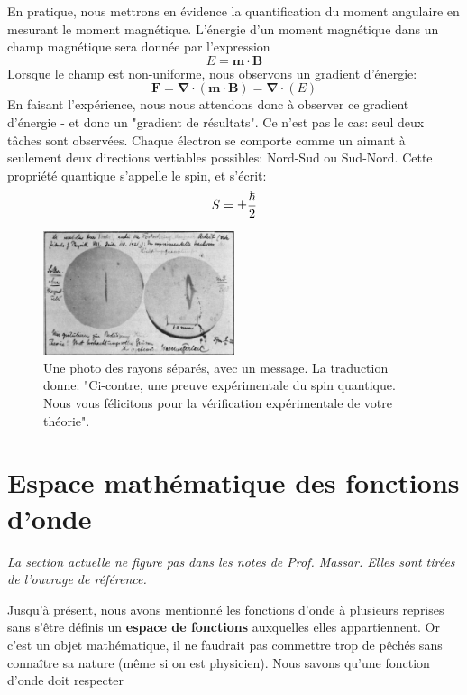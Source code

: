 \documentclass[../notesdecours.tex]{subfiles}
\begin{document}
En pratique, nous mettrons en évidence la quantification du moment angulaire en mesurant le moment magnétique. L'énergie d'un moment magnétique dans un champ magnétique sera donnée par l'expression
\begin{equation}
E = \bm{m}\cdot\bm{B}
\end{equation}
Lorsque le champ est non-uniforme, nous observons un gradient d'énergie:
\begin{equation}
\bm{F} = \bm{\nabla}\cdot(\bm{m}\cdot\bm{B}) = \bm{\nabla}\cdot(E)
\end{equation}
En faisant l'expérience, nous nous attendons donc à observer ce gradient d'énergie - et donc un "gradient de résultats". Ce n'est pas le cas: seul deux tâches sont observées. Chaque électron se comporte comme un aimant à seulement deux directions vertiables possibles: Nord-Sud ou Sud-Nord. Cette propriété quantique s'appelle le spin, et s'écrit:
\begin{equation}
S = \pm \frac{\hbar}{2}
\end{equation}

\begin{center}
\begin{figure}[h]
\centering
\includegraphics[width=0.50\textwidth]{exp.png}
\caption{Une photo des rayons séparés, avec un message. La traduction donne: "Ci-contre, une preuve expérimentale du spin quantique. Nous vous félicitons pour la vérification expérimentale de votre théorie".}
\end{figure}
\end{center}
\newpage
\section{Espace mathématique des fonctions d'onde}
\label{Espace mathématique des fonctions d'onde}
\begin{center}
\textit{La section actuelle ne figure pas dans les notes de Prof. Massar. Elles sont tirées de l'ouvrage de référence.}
\end{center}
Jusqu'à présent, nous avons mentionné les fonctions d'onde à plusieurs reprises sans s'être définis un \textbf{espace de fonctions} auxquelles elles appartiennent. Or c'est un objet mathématique, il ne faudrait pas commettre trop de pêchés sans connaître sa nature (même si on est physicien). Nous savons qu'une fonction d'onde doit respecter 
\end{document}
